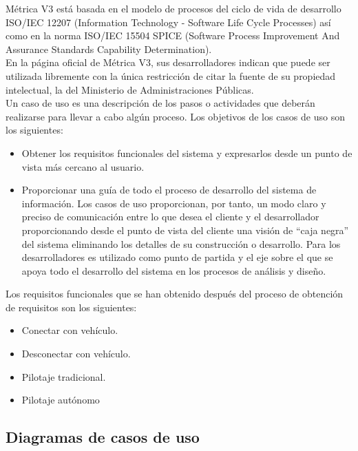Métrica V3\cite{website:metrica} está basada en el modelo de procesos del ciclo de vida de desarrollo ISO/IEC 12207 (Information Technology - Software Life Cycle Processes) así como en la norma ISO/IEC 15504 SPICE (Software Process Improvement And Assurance Standards Capability Determination).\\

En la página oficial de Métrica V3, sus desarrolladores indican que puede ser utilizada libremente con la única restricción de citar la fuente de su propiedad intelectual, la del Ministerio de Administraciones Públicas.\\

Un caso de uso es una descripción de los pasos o actividades que deberán realizarse para llevar a cabo algún proceso. Los objetivos de los casos de uso son los siguientes:

\begin{itemize}
\item Obtener los requisitos funcionales del sistema y expresarlos desde un punto de vista más cercano al usuario.
\item Proporcionar una guía de todo el proceso de desarrollo del sistema de información. Los casos de uso proporcionan, por tanto, un modo claro y preciso de comunicación entre lo que desea el cliente y el desarrollador proporcionando desde el punto de vista del cliente una visión de ``caja negra'' del sistema eliminando los detalles de su construcción o desarrollo. Para los desarrolladores es utilizado como punto de partida y el eje sobre el que se apoya todo el desarrollo del sistema en los procesos de análisis y diseño.
\end{itemize}

Los requisitos funcionales que se han obtenido después del proceso de obtención de requisitos son los siguientes:

\begin{itemize}
\item Conectar con vehículo.
\item Desconectar con vehículo.
\item Pilotaje tradicional.
\item Pilotaje autónomo
\end{itemize}

\subsection{Diagramas de casos de uso}
\label{sec:casos-de-uso}


